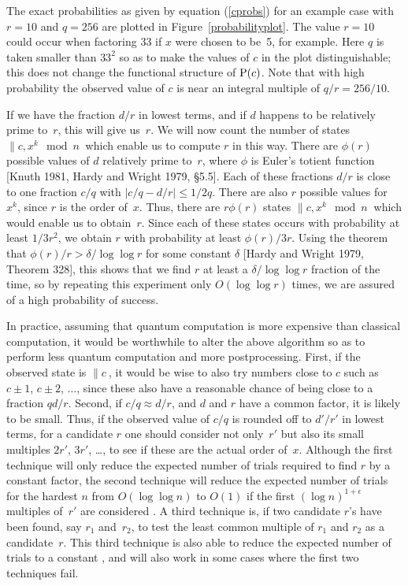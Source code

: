 The exact probabilities as 
given by equation (\ref{cprobs}) for an example case with $r=10$ and
$q=256$ are plotted in 
Figure~\ref{probabilityplot}.  The value $r=10$ could occur when factoring
33 if $x$ were chosen to be~5, for example. Here $q$ is taken smaller than 
$33^2$ so as to make the values of $c$ in the plot distinguishable;
this does not change the functional structure of ${\rm P}(c)$.  
Note that with high probability the
observed value of $c$ is near an integral multiple of $q/r = 256/10$.

If we have the fraction $d/r$ in lowest terms, and if $d$ happens to be
relatively prime to~$r$, this will give us~$r$.
We will now count the number of states $\|c,x^k\mod{n}\>$ which
enable us to compute $r$ in this way.  There are $\phi(r)$ possible values 
of $d$ relatively prime to~$r$, where $\phi$ is Euler's totient function
[Knuth 1981, Hardy and Wright 1979, \S5.5].
Each of these fractions $d/r$ is close to one fraction $c/q$ with
$|c/q-d/r| \leq 1/2q$.  There are also $r$ possible values for~$x^k$,
since $r$ is the order of~$x$.  Thus, there are $r \phi(r)$ states
$\|c,x^k\mod{n}\>$ which would enable us to obtain~$r$.  Since each
of these states occurs with probability at least $1/3r^2$, we obtain
$r$ with probability at least $\phi(r)/3r$.  Using the theorem that
$\phi(r)/r > \delta/\log \log r$ for some constant $\delta$ 
[Hardy and Wright 1979, Theorem 328], this shows that we find $r$ at least a 
$\delta/\log\log r$ fraction of the time, so by repeating this experiment
only $O(\log\log r)$ times, we are assured of a high probability of 
success.

In practice, assuming that quantum computation is more expensive than
classical computation, it would be worthwhile to alter the above algorithm
so as to perform less quantum computation and
more postprocessing.  First, if the observed state is $\|c\>$,
it would be wise to also try numbers close to $c$ such as $c\pm 1$, $c\pm 2$,
$\ldots$, since these also have a reasonable chance of being close to a
fraction $qd/r$.  Second, if $c/q \approx d/r$, and $d$ and $r$ have a 
common factor, it is likely to be small.  Thus,
if the observed value of $c/q$ is rounded off to
$d'/r'$ in lowest terms, for a
candidate $r$ one should consider not only~$r'$ but also its small multiples
$2r'$, $3r'$, \ldots, to see if these are the actual order of~$x$.  
Although the first technique will only reduce the expected number of trials
required to find $r$ by a constant factor, 
the second technique will reduce the expected number of trials 
for the hardest $n$ from $O(\log \log n)$ to $O(1)$ 
if the first $(\log n)^{1+\epsilon}$ multiples of~$r'$ are considered
\cite{Odly}.  A third technique is, if 
two candidate $r$'s have been found, say
$r_1$ and~$r_2$, to test the least common multiple of $r_1$ and $r_2$
as a candidate~$r$.  This third technique is also able to reduce the
expected number of trials to a constant \cite{Knil}, and will also work in 
some cases where the first two techniques fail.  

